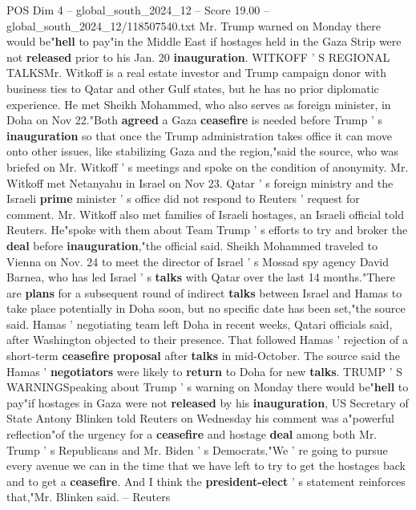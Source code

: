 \begin{textsample}{POS Dim 4 – global\_south\_2024\_12 – Score 19.00 – global\_south\_2024\_12/118507540.txt}
Mr.
Trump warned on Monday there would be"\textbf{hell} to pay"in the Middle East if hostages held in the Gaza Strip were not \textbf{released} prior to his Jan. 20 \textbf{inauguration}.
WITKOFF ' S REGIONAL TALKSMr.
Witkoff is a real estate investor and Trump campaign donor with business ties to Qatar and other Gulf states, but he has no prior diplomatic experience.
He met Sheikh Mohammed, who also serves as foreign minister, in Doha on Nov 22."Both \textbf{agreed} a Gaza \textbf{ceasefire} is needed before Trump ' s \textbf{inauguration} so that once the Trump administration takes office it can move onto other issues, like stabilizing Gaza and the region,"said the source, who was briefed on Mr.
Witkoff ' s meetings and spoke on the condition of anonymity.
Mr.
Witkoff met Netanyahu in Israel on Nov 23.
Qatar ' s foreign ministry and the Israeli \textbf{prime} minister ' s office did not respond to Reuters ' request for comment.
Mr.
Witkoff also met families of Israeli hostages, an Israeli official told Reuters.
He"spoke with them about Team Trump ' s efforts to try and broker the \textbf{deal} before \textbf{inauguration},"the official said.
Sheikh Mohammed traveled to Vienna on Nov. 24 to meet the director of Israel ' s Mossad spy agency David Barnea, who has led Israel ' s \textbf{talks} with Qatar over the last 14 months."There are \textbf{plans} for a subsequent round of indirect \textbf{talks} between Israel and Hamas to take place potentially in Doha soon, but no specific date has been set,"the source said.
Hamas ' negotiating team left Doha in recent weeks, Qatari officials said, after Washington objected to their presence.
That followed Hamas ' rejection of a short-term \textbf{ceasefire} \textbf{proposal} after \textbf{talks} in mid-October.
The source said the Hamas ' \textbf{negotiators} were likely to \textbf{return} to Doha for new \textbf{talks}.
TRUMP ' S WARNINGSpeaking about Trump ' s warning on Monday there would be"\textbf{hell} to pay"if hostages in Gaza were not \textbf{released} by his \textbf{inauguration}, US Secretary of State Antony Blinken told Reuters on Wednesday his comment was a"powerful reflection"of the urgency for a \textbf{ceasefire} and hostage \textbf{deal} among both Mr.
Trump ' s Republicans and Mr.
Biden ' s Democrats."We ' re going to pursue every avenue we can in the time that we have left to try to get the hostages back and to get a \textbf{ceasefire}.
And I think the \textbf{president-elect} ' s statement reinforces that,"Mr.
Blinken said. -- Reuters

\end{textsample}
